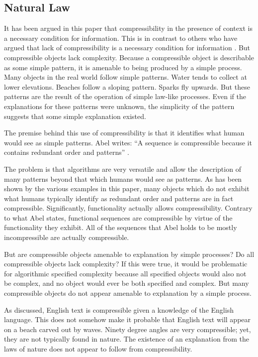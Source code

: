 \subsection{Natural Law}
It has been argued in this paper that compressibility in the presence of context is a necessary condition for information.
This is in contrast to others who have argued that lack of compressibility is a necessary condition for information \citep{Abel2005}.
But compressible objects lack complexity.
Because a compressible object is describable as some simple pattern, it is amenable to being produced by a simple process.
Many objects in the real world follow simple patterns.
Water tends to collect at lower elevations.
Beaches follow a sloping pattern.
Sparks fly upwards.
But these patterns are the result of the operation of simple law-like processes.
Even if the explanations for these patterns were unknown, the simplicity of the pattern suggests that some simple explanation existed.

The premise behind this use of compressibility is that it identifies what human would see as simple patterns.
Abel writes: ``A sequence is compressible because it contains redundant order and patterns'' \citep{Abel2005}.

The problem is that algorithms are very versatile and allow the description of many patterns beyond that which humans would see as patterns.
As has been shown by the various examples in this paper, many objects which do not exhibit what humans typically identify as redundant order and patterns are in fact compressible.
Significantly, functionality actually allows compressibility.
Contrary to what Abel states, functional sequences are compressible by virtue of the functionality they exhibit.
All of the sequences that Abel holds to be mostly incompressible are actually compressible.

But are compressible objects amenable to explanation by simple processes?
Do all compressible objects lack complexity?
If this were true, it would be problematic for algorithmic specified complexity because all specified objects would also not be complex, and no object would ever be both specified and complex.
But many compressible objects do not appear amenable to explanation by a simple process.

As discussed, English text is compressible given a knowledge of the English language.
This does not somehow make it probable that English text will appear on a beach carved out by waves.
Ninety degree angles are very compressible; yet, they are not typically found in nature.
The existence of an explanation from the laws of nature does not appear to follow from compressibility.

